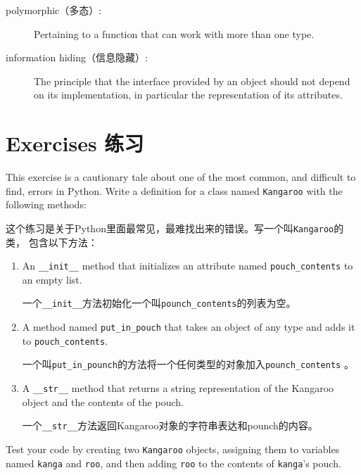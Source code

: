 \documentclass[10pt]{book}
\begin{document}
\begin{CJK}{UTF8}{gbsn}
\begin{description}
\item[polymorphic（多态）:] Pertaining to a function that can work with more
  than one type.  

\item[information hiding（信息隐藏）:] The principle that the interface provided 
by an object should not depend on its implementation, in particular
the representation of its attributes.


\end{description}

\section{Exercises 练习}

\begin{exercise}

This exercise is a cautionary tale about one of the most
common, and difficult to find, errors in Python.
Write a definition for a class named {\tt Kangaroo} with the following
methods:

这个练习是关于Python里面最常见，最难找出来的错误。写一个叫{\tt Kangaroo}的类，
包含以下方法：

\begin{enumerate}

\item An \verb"__init__" method that initializes an attribute named 
\verb"pouch_contents" to an empty list.

一个\verb"__init__"方法初始化一个叫\verb"pounch_contents"的列表为空。

\item A method named \verb"put_in_pouch" that takes an object
of any type and adds it to \verb"pouch_contents".

一个叫\verb"put_in_pounch"的方法将一个任何类型的对象加入\verb"pounch_contents"
。

\item A \verb"__str__" method that returns a string representation
of the Kangaroo object and the contents of the pouch.

一个\verb"__str__"方法返回Kangaroo对象的字符串表达和pounch的内容。

\end{enumerate}
%
Test your code 
by creating two {\tt Kangaroo} objects, assigning them to variables
named {\tt kanga} and {\tt roo}, and then adding {\tt roo} to the
contents of {\tt kanga}'s pouch.


\end{exercise}
\end{CJK}
\end{document}
